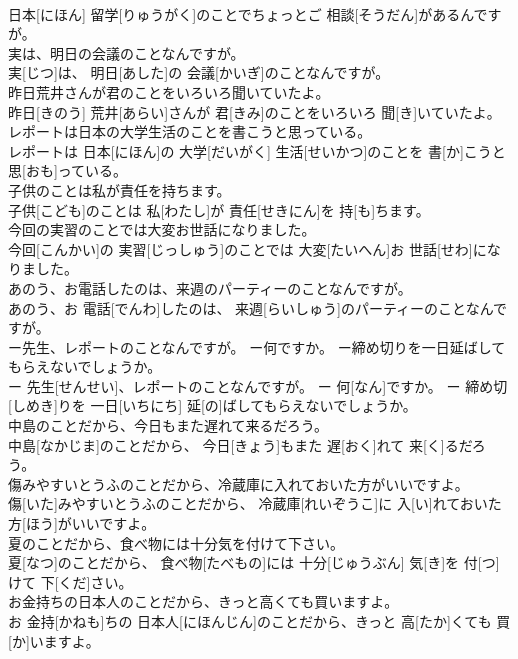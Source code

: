 \documentclass[8pt]{extreport}
\begin{document}
\begin{CJK}{UTF8}{min}
\\	日本[にほん] 留学[りゅうがく]のことでちょっとご 相談[そうだん]があるんですが。
\\	実は、明日の会議のことなんですが。	
\\	実[じつ]は、 明日[あした]の 会議[かいぎ]のことなんですが。
\\	昨日荒井さんが君のことをいろいろ聞いていたよ。	
\\	昨日[きのう] 荒井[あらい]さんが 君[きみ]のことをいろいろ 聞[き]いていたよ。
\\	レポートは日本の大学生活のことを書こうと思っている。	
\\	レポートは 日本[にほん]の 大学[だいがく] 生活[せいかつ]のことを 書[か]こうと 思[おも]っている。
\\	子供のことは私が責任を持ちます。	
\\	子供[こども]のことは 私[わたし]が 責任[せきにん]を 持[も]ちます。
\\	今回の実習のことでは大変お世話になりました。	
\\	今回[こんかい]の 実習[じっしゅう]のことでは 大変[たいへん]お 世話[せわ]になりました。
\\	あのう、お電話したのは、来週のパーティーのことなんですが。	
\\	あのう、お 電話[でんわ]したのは、 来週[らいしゅう]のパーティーのことなんですが。
\\	ー先生、レポートのことなんですが。 ー何ですか。 ー締め切りを一日延ばしてもらえないでしょうか。	
\\	ー 先生[せんせい]、レポートのことなんですが。 ー 何[なん]ですか。 ー 締め切[しめき]りを 一日[いちにち] 延[の]ばしてもらえないでしょうか。
\\	中島のことだから、今日もまた遅れて来るだろう。	
\\	中島[なかじま]のことだから、 今日[きょう]もまた 遅[おく]れて 来[く]るだろう。
\\	傷みやすいとうふのことだから、冷蔵庫に入れておいた方がいいですよ。	
\\	傷[いた]みやすいとうふのことだから、 冷蔵庫[れいぞうこ]に 入[い]れておいた 方[ほう]がいいですよ。
\\	夏のことだから、食べ物には十分気を付けて下さい。	
\\	夏[なつ]のことだから、 食べ物[たべもの]には 十分[じゅうぶん] 気[き]を 付[つ]けて 下[くだ]さい。
\\	お金持ちの日本人のことだから、きっと高くても買いますよ。	
\\	お 金持[かねも]ちの 日本人[にほんじん]のことだから、きっと 高[たか]くても 買[か]いますよ。

\end{CJK}
\end{document}

